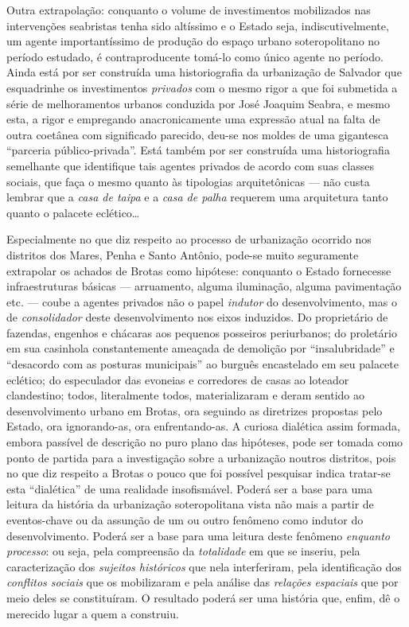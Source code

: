 Outra extrapolação: conquanto o volume de investimentos mobilizados nas intervenções seabristas tenha sido altíssimo e o Estado seja, indiscutivelmente, um agente importantíssimo de produção do espaço urbano soteropolitano no período estudado, é contraproducente tomá-lo como único agente no período. Ainda está por ser construída uma historiografia da urbanização de Salvador que esquadrinhe os investimentos \textit{privados} com o mesmo rigor a que foi submetida a série de melhoramentos urbanos conduzida por José Joaquim Seabra, e mesmo esta, a rigor e empregando anacronicamente uma expressão atual na falta de outra coetânea com significado parecido, deu-se nos moldes de uma gigantesca ``parceria público-privada''. Está também por ser construída uma historiografia semelhante que identifique tais agentes privados de acordo com suas classes sociais, que faça o mesmo quanto às tipologias arquitetônicas --- não custa lembrar que a \textit{casa de taipa} e a \textit{casa de palha} requerem uma arquitetura tanto quanto o palacete eclético\dots

Especialmente no que diz respeito ao processo de urbanização ocorrido nos distritos dos Mares, Penha e Santo Antônio, pode-se muito seguramente extrapolar os achados de Brotas como hipótese: conquanto o Estado fornecesse infraestruturas básicas --- arruamento, alguma iluminação, alguma pavimentação etc. --- coube a agentes privados não o papel \textit{indutor} do desenvolvimento, mas o de \textit{consolidador} deste desenvolvimento nos eixos induzidos. Do proprietário de fazendas, engenhos e chácaras aos pequenos posseiros periurbanos; do proletário em sua casinhola constantemente ameaçada de demolição por ``insalubridade'' e ``desacordo com as posturas municipais'' ao burguês encastelado em seu palacete eclético; do especulador das evoneias e corredores de casas ao loteador clandestino; todos, literalmente todos, materializaram e deram sentido ao desenvolvimento urbano em Brotas, ora seguindo as diretrizes propostas pelo Estado, ora ignorando-as, ora enfrentando-as. A curiosa dialética assim formada, embora passível de descrição no puro plano das hipóteses, pode ser tomada como ponto de partida para a investigação sobre a urbanização noutros distritos, pois no que diz respeito a Brotas o pouco que foi possível pesquisar indica tratar-se esta ``dialética'' de uma realidade insofismável. Poderá ser a base para uma leitura da história da urbanização soteropolitana vista não mais a partir de eventos-chave ou da assunção de um ou outro fenômeno como indutor do desenvolvimento. Poderá ser a base para uma leitura deste fenômeno \textit{enquanto processo}: ou seja, pela compreensão da \textit{totalidade} em que se inseriu, pela caracterização dos \textit{sujeitos históricos} que nela interferiram, pela identificação dos \textit{conflitos sociais} que os mobilizaram e pela análise das \textit{relações espaciais} que por meio deles se constituíram. O resultado poderá ser uma história que, enfim, dê o merecido lugar a quem a construiu.

